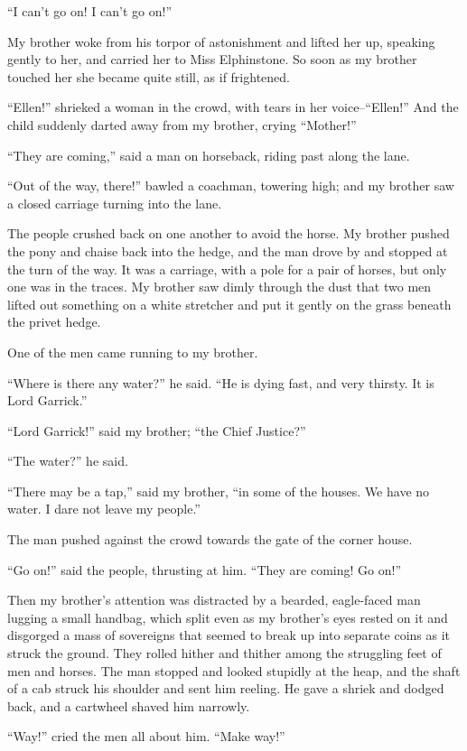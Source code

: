 ``I can't go on! I can't go on!''

My brother woke from his torpor of astonishment and lifted her up,
speaking gently to her, and carried her to Miss Elphinstone. So
soon as my brother touched her she became quite still, as if
frightened.

``Ellen!'' shrieked a woman in the crowd, with tears in her
voice--``Ellen!'' And the child suddenly darted away from my brother,
crying ``Mother!''

``They are coming,'' said a man on horseback, riding past along the
lane.

``Out of the way, there!'' bawled a coachman, towering high; and my
brother saw a closed carriage turning into the lane.

The people crushed back on one another to avoid the horse. My
brother pushed the pony and chaise back into the hedge, and the man
drove by and stopped at the turn of the way. It was a carriage,
with a pole for a pair of horses, but only one was in the traces.
My brother saw dimly through the dust that two men lifted out
something on a white stretcher and put it gently on the grass
beneath the privet hedge.

One of the men came running to my brother.

``Where is there any water?'' he said. ``He is dying fast, and very
thirsty. It is Lord Garrick.''

``Lord Garrick!'' said my brother; ``the Chief Justice?''

``The water?'' he said.

``There may be a tap,'' said my brother, ``in some of the houses. We
have no water. I dare not leave my people.''

The man pushed against the crowd towards the gate of the corner
house.

``Go on!'' said the people, thrusting at him. ``They are coming! Go
on!''

Then my brother's attention was distracted by a bearded,
eagle-faced man lugging a small handbag, which split even as my
brother's eyes rested on it and disgorged a mass of sovereigns that
seemed to break up into separate coins as it struck the ground.
They rolled hither and thither among the struggling feet of men and
horses. The man stopped and looked stupidly at the heap, and the
shaft of a cab struck his shoulder and sent him reeling. He gave a
shriek and dodged back, and a cartwheel shaved him narrowly.

``Way!'' cried the men all about him. ``Make way!''

